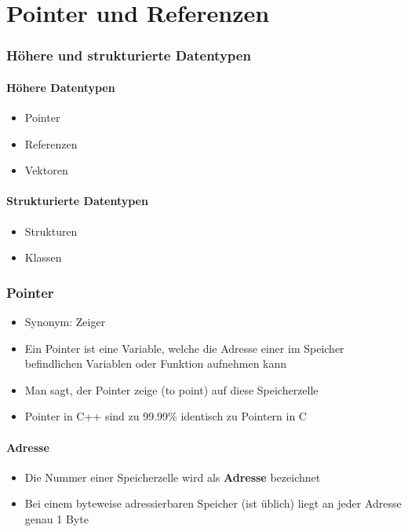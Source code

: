 
\part{Pointer und Referenzen}

\section{Höhere und strukturierte Datentypen}

\subsection{Höhere Datentypen}
\begin{itemize}
	\item Pointer
	\item Referenzen
	\item Vektoren
\end{itemize}

\subsection{Strukturierte Datentypen}
\begin{itemize}
	\item Strukturen
	\item Klassen
\end{itemize}

\section{Pointer}
\begin{itemize}
	\item Synonym: Zeiger
	\item Ein Pointer ist eine Variable, welche die Adresse einer im Speicher befindlichen Variablen oder Funktion aufnehmen kann
	\item Man sagt, der Pointer zeige (to point) auf diese Speicherzelle
	\item Pointer in C++ sind zu 99.99\% identisch zu Pointern in C
\end{itemize}

\subsection{Adresse}
\begin{itemize}
	\item Die Nummer einer Speicherzelle wird als \textbf{Adresse} bezeichnet
	\item Bei einem byteweise adressierbaren Speicher (ist üblich) liegt an jeder Adresse genau 1 Byte
\end{itemize}

